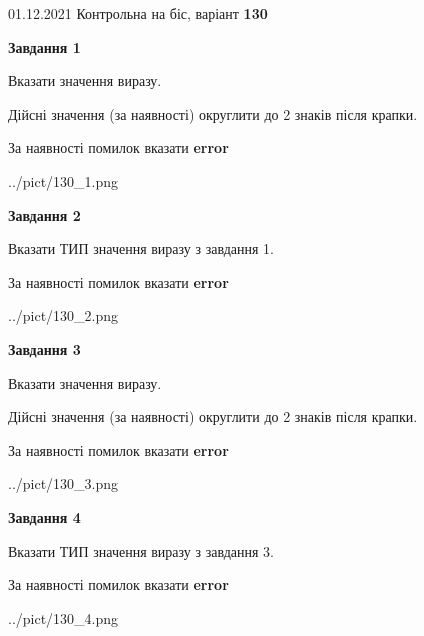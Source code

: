 \documentclass[11pt, ukrainian]{article}
\begin{document}
{01.12.2021 Контрольна на біс, варіант  \No \textbf { 130 }\par}
{
\begin {large}
{\begin {center}\textbf{Завдання 1}\end {center}}\par
Вказати значення виразу. \par
Дійсні значення (за наявності) округлити до 2 знаків після крапки. \par
За наявності помилок вказати \textbf{error}

\begin{center}
	{../pict/130_1.png}
\end{center}
\newpage

{\begin {center}\textbf{Завдання 2}\end {center}}\par
Вказати ТИП значення виразу з завдання 1. \par
За наявності помилок вказати \textbf{error}

\begin{center}
	{../pict/130_2.png}
\end{center}
\newpage

{\begin {center}\textbf{Завдання 3}\end {center}}\par
Вказати значення виразу. \par
Дійсні значення (за наявності) округлити до 2 знаків після крапки. \par
За наявності помилок вказати \textbf{error}

\begin{center}
	{../pict/130_3.png}
\end{center}
\newpage

{\begin {center}\textbf{Завдання 4}\end {center}}\par
Вказати ТИП значення виразу з завдання 3. \par
За наявності помилок вказати \textbf{error}

\begin{center}
	{../pict/130_4.png}
\end{center}
\newpage


\end{large}}
\end{document}
